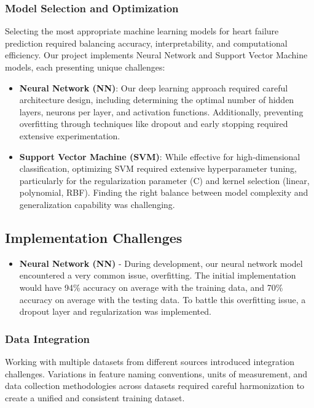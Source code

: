 \documentclass[11pt,a4paper]{article}
\newcommand{\greencheck}{\textcolor{green}{\ding{52}}}
\begin{document}
\subsubsection{Model Selection and Optimization}
\vspace{-0.25cm}
Selecting the most appropriate machine learning models for heart failure prediction required balancing accuracy, interpretability, and computational efficiency. Our project implements Neural Network and Support Vector Machine models, each presenting unique challenges:

\begin{itemize}
    \vspace{-0.25cm}
    \item \textbf{\greencheck \space Neural Network (NN)}: Our deep learning approach required careful architecture design, including determining the optimal number of hidden layers, neurons per layer, and activation functions. Additionally, preventing overfitting through techniques like dropout and early stopping required extensive experimentation.

    \item \textbf{\greencheck \space Support Vector Machine (SVM)}: While effective for high-dimensional classification, optimizing SVM required extensive hyperparameter tuning, particularly for the regularization parameter (C) and kernel selection (linear, polynomial, RBF). Finding the right balance between model complexity and generalization capability was challenging.
\end{itemize}

\subsection{Implementation Challenges}
\begin{itemize}
    \item \textbf{Neural Network (NN)} - During development, our neural network model encountered a very common issue, overfitting. The initial implementation would have 94\% accuracy on average with the training data, and 70\% accuracy on average with the testing data. To battle this overfitting issue, a dropout layer and regularization was implemented.
\end{itemize}

\subsubsection{Data Integration}
\vspace{-0.25cm}
Working with multiple datasets from different sources
introduced integration challenges.
Variations in feature naming conventions, units of measurement,
and data collection methodologies across datasets required
careful harmonization to create a unified and consistent training dataset.
\end{document}
